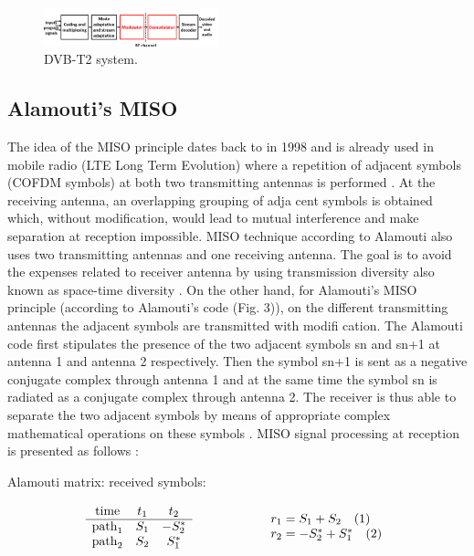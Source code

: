 \documentclass[10pt, conference]{IEEEtran}
\begin{document}
\begin{figure}[!htbp]
 \centering
    \includegraphics[width=0.45\textwidth]{images/2em_image.png}
    \caption{DVB-T2 system.}
\end{figure}

\subsection{Alamouti’s MISO}

\normalsize{
The idea of the MISO principle dates back to \cite{15} in
 1998 and is already used in mobile radio (LTE Long Term
 Evolution) where a repetition of adjacent symbols (COFDM
 symbols) at both two transmitting antennas is performed \cite{16}.
 At the receiving antenna, an overlapping grouping of adja
cent symbols is obtained which, without modification, would
 lead to mutual interference and make separation at reception
 impossible. MISO technique according to Alamouti also uses
 two transmitting antennas and one receiving antenna. The goal
 is to avoid the expenses related to receiver antenna by using
 transmission diversity also known as space-time diversity \cite{15}.
 On the other hand, for Alamouti’s MISO principle (according
 to Alamouti’s code (Fig. 3)), on the different transmitting
 antennas the adjacent symbols are transmitted with modifi
cation. The Alamouti code first stipulates the presence of
 the two adjacent symbols sn and sn+1 at antenna 1 and
 antenna 2 respectively. Then the symbol sn+1 is sent as a  negative conjugate complex through antenna 1 and at the
 same time the symbol sn is radiated as a conjugate complex
 through antenna 2. The receiver is thus able to separate
 the two adjacent symbols by means of appropriate complex
 mathematical operations on these symbols \cite{16}.
 MISO signal processing at reception is presented as follows :
 
 \begin{flushleft}
    Alamouti matrix: \hspace{2cm} received symbols:
\end{flushleft}

\[
\begin{array}{c cc}
    \text{time} & t_1 & t_2 \\ \hline
    \text{path}_1 & S_1 & -S_2^* \\
    \text{path}_2 & S_2 & S_1^* \\
\end{array}
\hspace{2cm}
\begin{array}{l}
    r_1 = S_1 + S_2 \quad (1) \\
    r_2 = -S_2^* + S_1^* \quad (2) \\
\end{array}
\]

}
\end{document}
